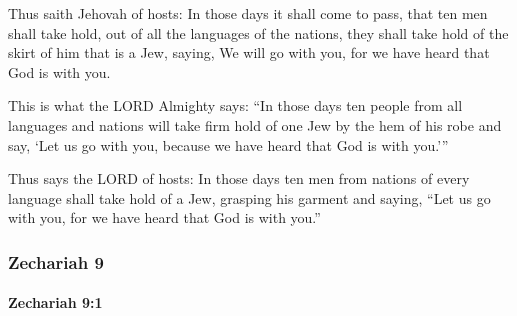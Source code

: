 			\begin{versebox}
					\item[BHS] 
					\item[LXX] 
					\item[ASV] Thus saith Jehovah of hosts: In those days it shall come to pass, that ten men shall take hold, out of all the languages of the nations, they shall take hold of the skirt of him that is a Jew, saying, We will go with you, for we have heard that God is with you.
					\item[NIV] This is what the LORD Almighty says: “In those days ten people from all languages and nations will take firm hold of one Jew by the hem of his robe and say, ‘Let us go with you, because we have heard that God is with you.’”
					\item[NRSV] Thus says the LORD of hosts: In those days ten men from nations of every language shall take hold of a Jew, grasping his garment and saying, “Let us go with you, for we have heard that God is with you.”
			\end{versebox}
	\subsubsection{Zechariah 9} %
		\label{ZECHARIAH-9}

		\paragraph{Zechariah 9:1} %
			\label{ZECHARIAH-9-1}


